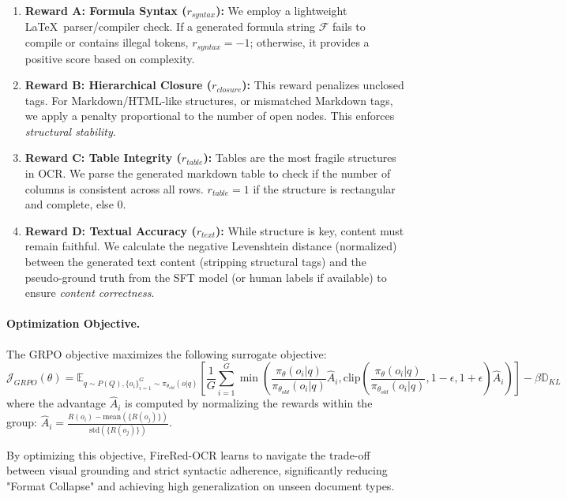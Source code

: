 \begin{enumerate}
    \item \textbf{Reward A: Formula Syntax ($r_{syntax}$):} We employ a lightweight \LaTeX\ parser/compiler check. If a generated formula string $\mathcal{F}$ fails to compile or contains illegal tokens, $r_{syntax} = -1$; otherwise, it provides a positive score based on complexity.
    \item \textbf{Reward B: Hierarchical Closure ($r_{closure}$):} This reward penalizes unclosed tags. For Markdown/HTML-like structures, or mismatched Markdown tags, we apply a penalty proportional to the number of open nodes. This enforces \textit{structural stability}.
    \item \textbf{Reward C: Table Integrity ($r_{table}$):} Tables are the most fragile structures in OCR. We parse the generated markdown table to check if the number of columns is consistent across all rows. $r_{table} = 1$ if the structure is rectangular and complete, else 0.
    \item \textbf{Reward D: Textual Accuracy ($r_{text}$):} While structure is key, content must remain faithful. We calculate the negative Levenshtein distance (normalized) between the generated text content (stripping structural tags) and the pseudo-ground truth from the SFT model (or human labels if available) to ensure \textit{content correctness}.
\end{enumerate}

\paragraph{Optimization Objective.}
The GRPO objective maximizes the following surrogate objective:
\begin{equation}
    \mathcal{J}_{GRPO}(\theta) = \mathbb{E}_{q \sim P(Q), \{o_i\}_{i=1}^G \sim \pi_{\theta_{old}}(o|q)} \left[ \frac{1}{G} \sum_{i=1}^G \min \left( \frac{\pi_\theta(o_i|q)}{\pi_{\theta_{old}}(o_i|q)} \hat{A}_i, \text{clip}\left(\frac{\pi_\theta(o_i|q)}{\pi_{\theta_{old}}(o_i|q)}, 1-\epsilon, 1+\epsilon\right) \hat{A}_i \right) \right] - \beta \mathbb{D}_{KL}
\end{equation}
where the advantage $\hat{A}_i$ is computed by normalizing the rewards within the group: $\hat{A}_i = \frac{R(o_i) - \text{mean}(\{R(o_j)\})}{\text{std}(\{R(o_j)\})}$.

By optimizing this objective, FireRed-OCR learns to navigate the trade-off between visual grounding and strict syntactic adherence, significantly reducing "Format Collapse" and achieving high generalization on unseen document types.

